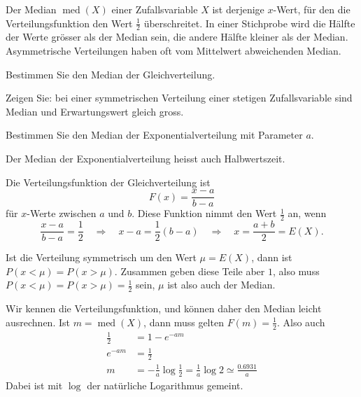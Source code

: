 Der Median $\operatorname{med}(X)$ einer Zufallsvariable $X$
ist derjenige $x$-Wert, für den die
Verteilungsfunktion den Wert $\frac12$ überschreitet. In einer
Stichprobe wird die Hälfte der Werte grösser als der Median
sein, die andere Hälfte kleiner als der Median. Asymmetrische
Verteilungen haben oft vom Mittelwert abweichenden Median.


\begin{teilaufgaben}
\item Bestimmen Sie den Median der Gleichverteilung.
\item Zeigen Sie: bei einer symmetrischen Verteilung einer
stetigen Zufallsvariable sind Median
und Erwartungswert gleich gross.
\item Bestimmen Sie den Median der Exponentialverteilung mit Parameter $a$.
\end{teilaufgaben}
Der Median der Exponentialverteilung heisst auch Halbwertszeit.


\begin{loesung}
\begin{teilaufgaben}
\item Die Verteilungsfunktion der Gleichverteilung ist
\[
F(x)=\frac{x-a}{b-a}
\]
für $x$-Werte zwischen $a$ und $b$. Diese Funktion nimmt den
Wert $\frac12$ an, wenn
\[
\frac{x-a}{b-a}=\frac12
\quad\Rightarrow\quad
x-a=\frac12(b-a)
\quad\Rightarrow\quad
x=\frac{a+b}2=E(X).
\]
\item Ist die Verteilung symmetrisch um den Wert $\mu=E(X)$, dann
ist $P(x<\mu)=P(x>\mu)$. Zusammen geben diese Teile aber $1$, also
muss $P(x<\mu)=P(x>\mu)=\frac12$ sein, $\mu$ ist also auch der Median.
\item
Wir kennen die Verteilungsfunktion, und können daher den Median
leicht ausrechnen. Ist $m=\operatorname{med}(X)$, dann muss
gelten $F(m)=\frac12$. Also auch
\begin{align*}
\frac12&=1-e^{-am}\\
e^{-am}&=\frac12\\
m&=-\frac1a\log\frac12=\frac1a\log 2\simeq\frac{0.6931}{a}
\end{align*}
Dabei ist mit $\log$ der natürliche Logarithmus gemeint.
\qedhere
\end{teilaufgaben}
\end{loesung}

